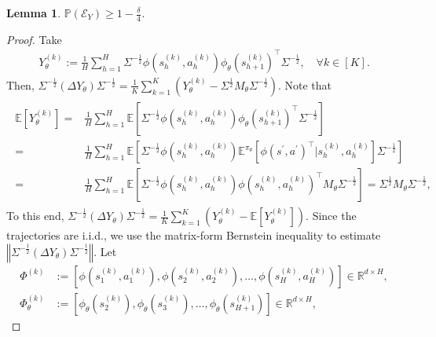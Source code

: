 \documentclass{article}
\newtheorem{lemma}{Lemma}[section]
\numberwithin{equation}{section}
\begin{document}
\begin{lemma}
\label{dy_homo}
$\mathbb{P}\left(\mathcal{E}_{Y}\right)\geq 1-\frac{\delta}{4}$. 
\end{lemma}
\begin{proof}
Take
\begin{align*}
	Y_\theta^{(k)}:=\frac{1}{H}\sum_{h=1}^H\Sigma^{-\frac{1}{2}}\phi\left(s^{(k)}_h,a^{(k)}_h\right)\phi_\theta\left(s^{(k)}_{h+1}\right)^\top\Sigma^{-\frac{1}{2}},\quad\forall k\in[K]. 
\end{align*}
Then, $\Sigma^{-\frac{1}{2}}\left(\Delta Y_\theta\right)\Sigma^{-\frac{1}{2}}=\frac{1}{K}\sum_{k=1}^K\left(Y_\theta^{(k)}-\Sigma^{\frac{1}{2}}M_\theta\Sigma^{-\frac{1}{2}}\right)$. Note that
\begin{align}
    \label{SMS0_homo} 
    \begin{aligned} 
        \mathbb{E}\left[Y_\theta^{(k)}\right]=&\frac{1}{H}\sum_{h=1}^H\mathbb{E}\left[\Sigma^{-\frac{1}{2}}\phi\left(s^{(k)}_h,a^{(k)}_h\right)\phi_\theta\left(s^{(k)}_{h+1}\right)^\top\Sigma^{-\frac{1}{2}}\right]\\
        =&\frac{1}{H}\sum_{h=1}^H\mathbb{E}\left[\Sigma^{-\frac{1}{2}}\phi\left(s^{(k)}_h,a^{(k)}_h\right)\mathbb{E}^{\pi_\theta}\left[\phi\left(s^\prime,a^\prime\right)^\top\vert s^{(k)}_h,a^{(k)}_h\right]\Sigma^{-\frac{1}{2}}\right]\\
        =&\frac{1}{H}\sum_{h=1}^H\mathbb{E}\left[\Sigma^{-\frac{1}{2}}\phi\left(s^{(k)}_h,a^{(k)}_h\right)\phi\left(s^{(k)}_h,a^{(k)}_h\right)^\top M_\theta\Sigma^{-\frac{1}{2}}\right]=\Sigma^{\frac{1}{2}}M_\theta\Sigma^{-\frac{1}{2}}, 
    \end{aligned}
\end{align}
To this end, $\Sigma^{-\frac{1}{2}}\left(\Delta Y_\theta\right)\Sigma^{-\frac{1}{2}}=\frac{1}{K}\sum_{k=1}^K\left(Y_\theta^{(k)}-\mathbb{E}\left[Y_\theta^{(k)}\right]\right)$. Since the trajectories are \textrm{i.i.d.}, we use the matrix-form Bernstein inequality to estimate $\left\Vert\Sigma^{-\frac{1}{2}}(\Delta Y_\theta)\Sigma^{-\frac{1}{2}}\right\Vert$. Let
\begin{align*}
\Phi^{(k)}&:=\left[\phi\left(s^{(k)}_1,a^{(k)}_1\right),\phi\left(s^{(k)}_2,a^{(k)}_2\right),\ldots,\phi\left(s^{(k)}_H,a^{(k)}_H\right)\right]\in\mathbb{R}^{d\times H},\\
\Phi^{(k)}_\theta&:=\left[\phi_\theta\left(s^{(k)}_2\right),\phi_\theta\left(s^{(k)}_3\right),\ldots,\phi_\theta\left(s^{(k)}_{H+1}\right)\right]\in\mathbb{R}^{d\times H},
\end{align*}

\end{proof}
\end{document}
